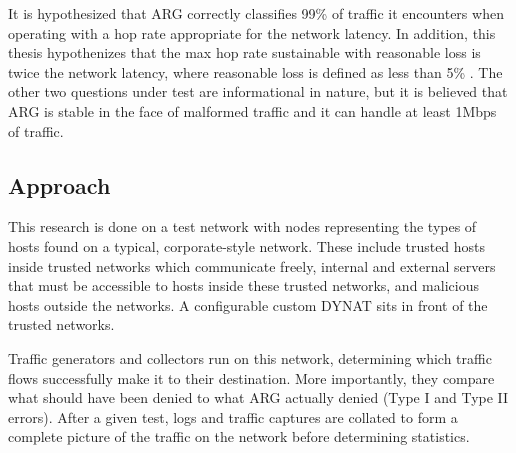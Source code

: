 
\par It is hypothesized that \ac{ARG} correctly classifies 99\% of traffic it encounters when operating with a hop rate appropriate for the network latency. In addition, this thesis hypothenizes that the max hop rate sustainable with reasonable loss is twice the network latency, where reasonable loss is defined as less than 5\% . The other two questions under test are informational in nature, but it is believed that \ac{ARG} is stable in the face of malformed traffic and it can handle at least 1Mbps of traffic.  

\subsection{Approach}
\label{sec:approach}
\par This research is done on a test network with nodes representing the types of hosts found on a typical, corporate-style network. These include trusted hosts inside trusted networks which communicate freely, internal and external servers that must be accessible to hosts inside these trusted networks, and malicious hosts outside the networks. A configurable custom \ac{DYNAT} sits in front of the trusted networks. 

\par Traffic generators and collectors run on this network, determining which traffic flows successfully make it to their destination. More importantly, they compare what should have been denied to what \ac{ARG} actually denied (Type I and Type II errors). After a given test, logs and traffic captures are collated to form a complete picture of the traffic on the network before determining statistics.

\FloatBarrier
